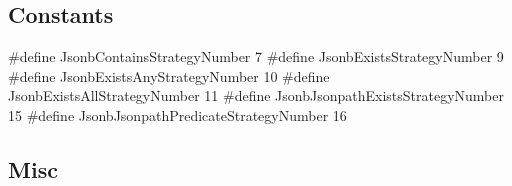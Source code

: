 \documentclass[11pt]{article}
\begin{document}
\hypertarget{constants}{%
\subsection{Constants}\label{constants}}

\begin{ccode}
#define JsonbContainsStrategyNumber   7
#define JsonbExistsStrategyNumber   9
#define JsonbExistsAnyStrategyNumber  10
#define JsonbExistsAllStrategyNumber  11
#define JsonbJsonpathExistsStrategyNumber   15
#define JsonbJsonpathPredicateStrategyNumber  16
\end{ccode}

\hypertarget{misc}{%
\subsection{Misc}\label{misc}}
\end{document}

